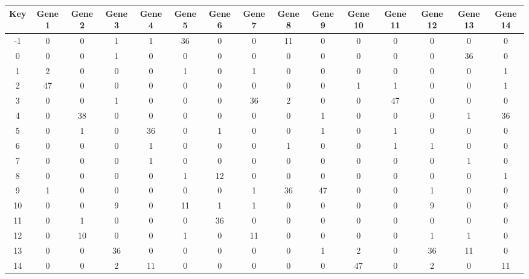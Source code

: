 \begin{tabular}{|c|c|c|c|c|c|c|c|c|c|c|c|c|c|c|}
\hline
Key & Gene 1 & Gene 2 & Gene 3 & Gene 4 & Gene 5 & Gene 6 & Gene 7 & Gene 8 & Gene 9 & Gene 10 & Gene 11 & Gene 12 & Gene 13 & Gene 14 \\
\hline
-1 & 0 & 0 & 1 & 1 & 36 & 0 & 0 & 11 & 0 & 0 & 0 & 0 & 0 & 0 \\
0 & 0 & 0 & 1 & 0 & 0 & 0 & 0 & 0 & 0 & 0 & 0 & 0 & 36 & 0 \\
1 & 2 & 0 & 0 & 0 & 1 & 0 & 1 & 0 & 0 & 0 & 0 & 0 & 0 & 1 \\
2 & 47 & 0 & 0 & 0 & 0 & 0 & 0 & 0 & 0 & 1 & 1 & 0 & 0 & 1 \\
3 & 0 & 0 & 1 & 0 & 0 & 0 & 36 & 2 & 0 & 0 & 47 & 0 & 0 & 0 \\
4 & 0 & 38 & 0 & 0 & 0 & 0 & 0 & 0 & 1 & 0 & 0 & 0 & 1 & 36 \\
5 & 0 & 1 & 0 & 36 & 0 & 1 & 0 & 0 & 1 & 0 & 1 & 0 & 0 & 0 \\
6 & 0 & 0 & 0 & 1 & 0 & 0 & 0 & 1 & 0 & 0 & 1 & 1 & 0 & 0 \\
7 & 0 & 0 & 0 & 1 & 0 & 0 & 0 & 0 & 0 & 0 & 0 & 0 & 1 & 0 \\
8 & 0 & 0 & 0 & 0 & 1 & 12 & 0 & 0 & 0 & 0 & 0 & 0 & 0 & 1 \\
9 & 1 & 0 & 0 & 0 & 0 & 0 & 1 & 36 & 47 & 0 & 0 & 1 & 0 & 0 \\
10 & 0 & 0 & 9 & 0 & 11 & 1 & 1 & 0 & 0 & 0 & 0 & 9 & 0 & 0 \\
11 & 0 & 1 & 0 & 0 & 0 & 36 & 0 & 0 & 0 & 0 & 0 & 0 & 0 & 0 \\
12 & 0 & 10 & 0 & 0 & 1 & 0 & 11 & 0 & 0 & 0 & 0 & 1 & 1 & 0 \\
13 & 0 & 0 & 36 & 0 & 0 & 0 & 0 & 0 & 1 & 2 & 0 & 36 & 11 & 0 \\
14 & 0 & 0 & 2 & 11 & 0 & 0 & 0 & 0 & 0 & 47 & 0 & 2 & 0 & 11 \\
\hline
\end{tabular}